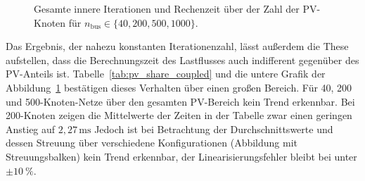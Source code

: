 %




\begin{figure}[htbp]
	\centering
	
	\caption{Gesamte innere Iterationen und Rechenzeit über der Zahl der PV-Knoten
		für $n_\mathrm{bus}\in\{40,200,500,1000\}$.}
	\label{fig:p1-kout-kin-vs-npv}
\end{figure}


Das Ergebnis, der nahezu konstanten Iterationenzahl, lässt außerdem die These aufstellen, dass die Berechnungszeit des Lastflusses auch indifferent gegenüber des PV-Anteils ist.
Tabelle~\ref{tab:pv_share_coupled} und die untere Grafik der Abbildung~\ref{fig:p1-kout-kin-vs-npv} bestätigen dieses Verhalten über einen großen Bereich.
Für 40, 200 und 500-Knoten-Netze über den gesamten PV-Bereich kein Trend erkennbar. 
Bei 200-Knoten zeigen die Mittelwerte der Zeiten in der Tabelle zwar einen geringen Anstieg auf $2,27\,\mathrm{ms}$
Jedoch ist bei Betrachtung der Durchschnittswerte und dessen Streuung über verschiedene Konfigurationen (Abbildung mit Streuungsbalken) kein Trend erkennbar, der Linearisierungsfehler bleibt bei unter $\pm\SI{10}{\percent}$.\\

